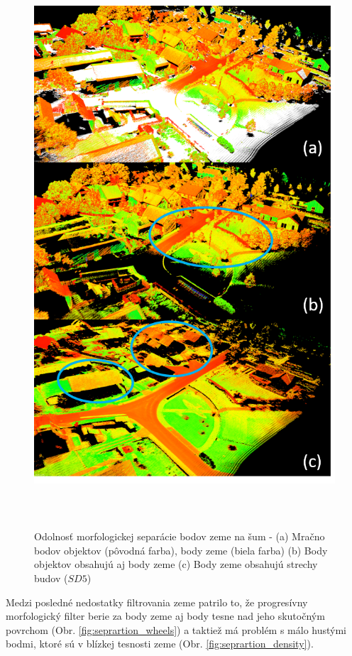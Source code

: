 \newpage\vfill
\begin{figure}[!htbp]
  \centering
  \includegraphics[width=16cm, height=21cm]{img/UAV_ground.png}
  \caption{Odolnosť morfologickej separácie bodov zeme na šum - (a) Mračno bodov objektov (pôvodná farba), body zeme (biela farba) (b) Body objektov obsahujú aj body zeme (c) Body zeme obsahujú strechy budov ($SD5$)} 
  \label{fig:UAV_ground}
\end{figure}
\vfill\clearpage 

\indent Medzi posledné nedostatky filtrovania zeme patrilo to, že progresívny morfologický filter berie za body zeme aj body tesne nad jeho skutočným povrchom (Obr. \ref{fig:seprartion_wheels}) a taktiež má problém s málo hustými bodmi, ktoré sú v blízkej tesnosti zeme (Obr. \ref{fig:seprartion_density}).

